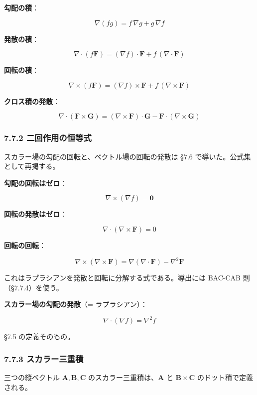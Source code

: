 \documentclass[a4paper,12pt,openany]{book}
\begin{document}
\textbf{勾配の積}：

\[\nabla(fg) = f\,\nabla g + g\,\nabla f\]

\textbf{発散の積}：

\[\nabla \cdot (f\mathbf{F}) = (\nabla f) \cdot \mathbf{F} + f\,(\nabla \cdot \mathbf{F})\]

\textbf{回転の積}：

\[\nabla \times (f\mathbf{F}) = (\nabla f) \times \mathbf{F} + f\,(\nabla \times \mathbf{F})\]

\textbf{クロス積の発散}：

\[\nabla \cdot (\mathbf{F} \times \mathbf{G}) = (\nabla \times \mathbf{F}) \cdot \mathbf{G} - \mathbf{F} \cdot (\nabla \times \mathbf{G})\]

\hypertarget{ux4e8cux56deux4f5cux7528ux306eux6052ux7b49ux5f0f}{%
\subsubsection{7.7.2
二回作用の恒等式}\label{ux4e8cux56deux4f5cux7528ux306eux6052ux7b49ux5f0f}}

スカラー場の勾配の回転と、ベクトル場の回転の発散は §7.6
で導いた。公式集として再掲する。

\textbf{勾配の回転はゼロ}：

\[\nabla \times (\nabla f) = \mathbf{0}\]

\textbf{回転の発散はゼロ}：

\[\nabla \cdot (\nabla \times \mathbf{F}) = 0\]

\textbf{回転の回転}：

\[\nabla \times (\nabla \times \mathbf{F}) = \nabla(\nabla \cdot \mathbf{F}) - \nabla^2 \mathbf{F}\]

これはラプラシアンを発散と回転に分解する式である。導出には BAC-CAB
則（§7.7.4）を使う。

\textbf{スカラー場の勾配の発散}（= ラプラシアン）：

\[\nabla \cdot (\nabla f) = \nabla^2 f\]

§7.5 の定義そのもの。

\hypertarget{ux30b9ux30abux30e9ux30fcux4e09ux91cdux7a4d}{%
\subsubsection{7.7.3
スカラー三重積}\label{ux30b9ux30abux30e9ux30fcux4e09ux91cdux7a4d}}

三つの縦ベクトル \(\mathbf{A}, \mathbf{B}, \mathbf{C}\)
のスカラー三重積は、\(\mathbf{A}\) と \(\mathbf{B}\times\mathbf{C}\)
のドット積で定義される。
\end{document}
